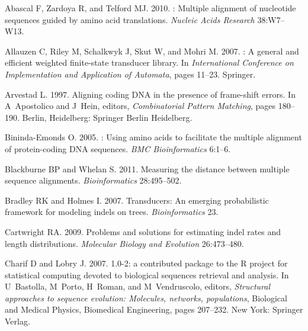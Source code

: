 \documentclass[12pt,letterpaper]{article}
\begin{document}
\clearpage
\newpage
%
\setlength{\bibhang}{0pt}
%
\begin{thebibliography}{44}
\providecommand{\natexlab}[1]{#1}

Abascal F, Zardoya R, and Telford MJ. 2010.
: Multiple alignment of nucleotide sequences guided by
  amino acid translations.
\newblock \emph{Nucleic Acids Research} 38:W7--W13.

Allauzen C, Riley M, Schalkwyk J, Skut W, and Mohri M. 2007.
: A general and efficient weighted finite-state transducer
  library.
\newblock In \emph{International Conference on Implementation and Application
  of Automata}, pages 11--23. Springer.

Arvestad L. 1997.
\newblock Aligning coding {DNA} in the presence of frame-shift errors.
\newblock In A~Apostolico and J~Hein, editors, \emph{Combinatorial Pattern
  Matching}, pages 180--190. Berlin, Heidelberg: Springer Berlin Heidelberg.

Bininda-Emonds O. 2005.
: Using amino acids to facilitate the multiple alignment
  of protein-coding {DNA} sequences.
\newblock \emph{BMC Bioinformatics} 6:1--6.

Blackburne BP and Whelan S. 2011.
\newblock Measuring the distance between multiple sequence alignments.
\newblock \emph{Bioinformatics} 28:495--502.

Bradley RK and Holmes I. 2007.
\newblock Transducers: An emerging probabilistic framework for modeling indels
  on trees.
\newblock \emph{Bioinformatics} 23.

Cartwright RA. 2009.
\newblock Problems and solutions for estimating indel rates and length
  distributions.
\newblock \emph{Molecular Biology and Evolution} 26:473--480.

Charif D and Lobry J. 2007.
 1.0-2: a contributed package to the {R} project for
  statistical computing devoted to biological sequences retrieval and analysis.
\newblock In U~Bastolla, M~Porto, H~Roman, and M~Vendruscolo, editors,
  \emph{Structural approaches to sequence evolution: Molecules, networks,
  populations}, Biological and Medical Physics, Biomedical Engineering, pages
  207--232. New York: Springer Verlag.


\end{thebibliography}
\end{document}
